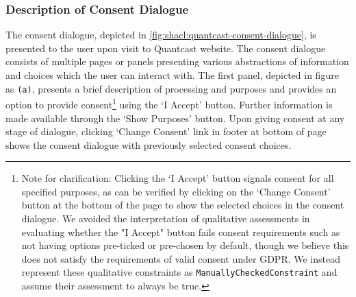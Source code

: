\subsubsection{Description of Consent Dialogue}
The consent dialogue, depicted in \autoref{fig:shacl:quantcast-consent-dialogue}, is presented to the user upon visit to Quantcast website. The consent dialogue consists of multiple pages or panels presenting various abstractions of information and choices which the user can interact with.
The first panel, depicted in figure as \texttt{(a)}, presents a brief description of processing and purposes and provides an option to provide consent\footnote{Note for clarification: Clicking the `I Accept' button signals consent for all specified purposes, as can be verified by clicking on the `Change Consent' button at the bottom of the page to show the selected choices in the consent dialogue. We avoided the interpretation of qualitative assessments in evaluating whether the "I Accept" button fails consent requirements such as not having options pre-ticked or pre-chosen by default, though we believe this does not satisfy the requirements of valid consent under GDPR. We instead represent these qualitative constraints as \texttt{ManuallyCheckedConstraint} and assume their assessment to always be true.} using the `I Accept' button. Further information is made available through the `Show Purposes' button. Upon giving consent at any stage of dialogue, clicking `Change Consent' link in footer at bottom of page shows the consent dialogue with previously selected consent choices.
